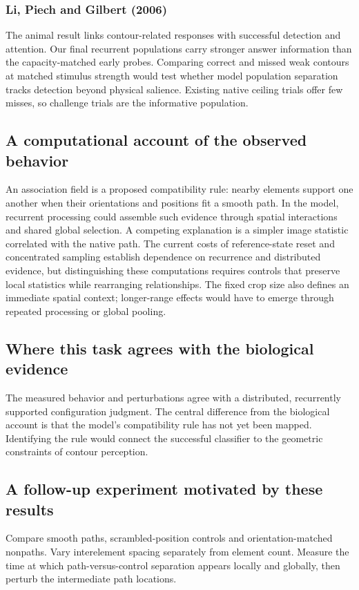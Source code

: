 \documentclass[11pt]{article}
\begin{document}
\subsubsection{Li, Piech and Gilbert (2006)}
The animal result links contour-related responses with successful detection and attention. Our final recurrent populations carry stronger answer information than the capacity-matched early probes. Comparing correct and missed weak contours at matched stimulus strength would test whether model population separation tracks detection beyond physical salience. Existing native ceiling trials offer few misses, so challenge trials are the informative population. \cite{bio_li}

\subsection{A computational account of the observed behavior}
An association field is a proposed compatibility rule: nearby elements support one another when their orientations and positions fit a smooth path. In the model, recurrent processing could assemble such evidence through spatial interactions and shared global selection. A competing explanation is a simpler image statistic correlated with the native path. The current costs of reference-state reset and concentrated sampling establish dependence on recurrence and distributed evidence, but distinguishing these computations requires controls that preserve local statistics while rearranging relationships. The fixed crop size also defines an immediate spatial context; longer-range effects would have to emerge through repeated processing or global pooling.

\subsection{Where this task agrees with the biological evidence}
The measured behavior and perturbations agree with a distributed, recurrently supported configuration judgment. The central difference from the biological account is that the model’s compatibility rule has not yet been mapped. Identifying the rule would connect the successful classifier to the geometric constraints of contour perception.

\subsection{A follow-up experiment motivated by these results}
Compare smooth paths, scrambled-position controls and orientation-matched nonpaths. Vary interelement spacing separately from element count. Measure the time at which path-versus-control separation appears locally and globally, then perturb the intermediate path locations.
\end{document}
